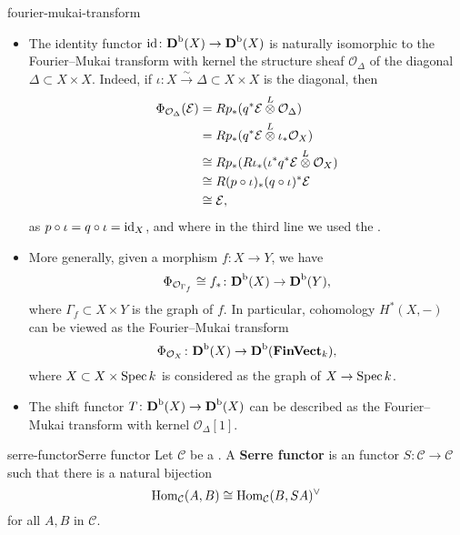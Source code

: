 \begin{example}{fourier-mukai-transform}
    \begin{itemize}
        \item The identity functor $\textup{id} \colon \textbf{D}^\textup{b}(X) \to \textbf{D}^\textup{b}(X)$ is naturally isomorphic to the Fourier--Mukai transform with kernel the structure sheaf $\mathcal{O}_\Delta$ of the diagonal $\Delta \subset X \times X$. Indeed, if $\iota : X \xrightarrow{\sim} \Delta \subset X \times X$ is the diagonal, then
        \[ \begin{aligned}
            \Phi_{\mathcal{O}_\Delta}(\mathcal{E})
                &= R p_* (q^* \mathcal{E} \overset{L}{\otimes} \mathcal{O}_\Delta) \\
                &= R p_* (q^* \mathcal{E} \overset{L}{\otimes} \iota_* \mathcal{O}_X) \\
                &\cong R p_* (R \iota_* (\iota^* q^* \mathcal{E} \overset{L}{\otimes} \mathcal{O}_X) \\
                &\cong R (p \circ \iota)_* (q \circ \iota)^* \mathcal{E} \\
                &\cong \mathcal{E} ,
        \end{aligned} \]
        as $p \circ \iota = q \circ \iota = \textup{id}_X$, and where in the third line we used the .
        
        \item More generally, given a morphism $f \colon X \to Y$, we have
        \[ \Phi_{\mathcal{O}_{\Gamma_f}} \cong f_* \colon \textbf{D}^\textup{b}(X) \to \textbf{D}^\textup{b}(Y) , \]
        where $\Gamma_f \subset X \times Y$ is the graph of $f$. In particular, cohomology $H^*(X, -)$ can be viewed as the Fourier--Mukai transform
        \[ \Phi_{\mathcal{O}_X} \colon \textbf{D}^\textup{b}(X) \to \textbf{D}^\textup{b}(\textbf{FinVect}_k) , \]
        where $X \subset X \times \operatorname{Spec} k$ is considered as the graph of $X \to \operatorname{Spec} k$.
        
        \item The shift functor $T \colon \textbf{D}^\textup{b}(X) \to \textbf{D}^\textup{b}(X)$ can be described as the Fourier--Mukai transform with kernel $\mathcal{O}_{\Delta}[1]$.
    \end{itemize}
\end{example}

\begin{topic}{serre-functor}{Serre functor}
    Let $\mathcal{C}$ be a . A \textbf{Serre functor} is an  functor $S \colon \mathcal{C} \to \mathcal{C}$ such that there is a natural bijection
    \[ \operatorname{Hom}_\mathcal{C}(A, B) \cong \operatorname{Hom}_\mathcal{C}(B, SA)^\vee \]
    for all $A, B$ in $\mathcal{C}$.
\end{topic}

